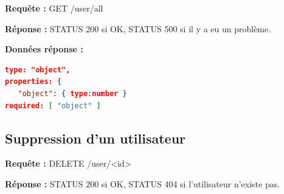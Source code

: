 \documentclass[12pt,a4paper]{report}
\begin{document}
\textbf{Requête :} GET /user/all

\textbf{Réponse :} STATUS 200 si OK, STATUS 500 si il y a eu un problème.

\textbf{Données réponse :} 

\begin{lstlisting}[language=JSON]
type: "object",
properties: {
   "object": { type:number }
required: [ "object" ]
\end{lstlisting}

\subsection{Suppression d'un utilisateur}

\textbf{Requête :} DELETE /user/<id>

\textbf{Réponse :} STATUS 200 si OK, STATUS 404 si l'utilisateur n'existe pas.
\end{document}
